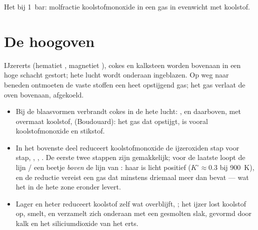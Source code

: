 \begin{omfigure}

{\small Het  bij \qty{1}{bar}: molfractie koolstofmonoxide
in een gas in evenwicht met koolstof.}
\end{omfigure}

\section{De hoogoven}

IJzererts (hematiet , magnetiet ), cokes en kalksteen worden
bovenaan in een hoge schacht gestort; hete lucht wordt
onderaan ingeblazen. Op weg naar beneden ontmoeten de vaste stoffen een heet opstijgend gas; het gas
verlaat de oven bovenaan, afgekoeld.
\begin{itemize}
  \item Bij de blaasvormen verbrandt cokes in de hete lucht: , en
        daarboven, met overmaat koolstof,  (Boudouard): het gas
        dat opstijgt, is vooral koolstofmonoxide en stikstof.
  \item In het bovenste deel reduceert koolstofmonoxide de ijzeroxiden stap voor
        stap, , ,
        . De eerste twee stappen zijn gemakkelijk; voor de laatste
        loopt de lijn / een beetje \textit{boven} de lijn van
        : haar  is licht positief
        ($K^\circ \approx 0.3$ bij \qty{900}{K}), en de reductie vereist een gas
        dat minstens driemaal meer  dan  bevat --- wat het
         in de hete zone eronder levert.
  \item Lager en heter reduceert koolstof zelf wat overblijft, ; het ijzer lost koolstof op, smelt, en verzamelt zich onderaan
        met een gesmolten slak, gevormd door kalk en het siliciumdioxide van het erts.
\end{itemize}

